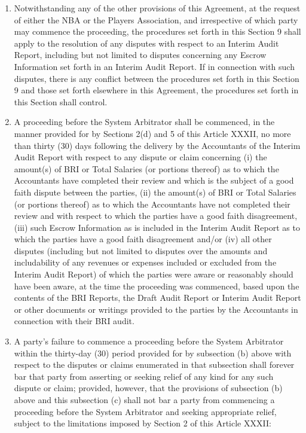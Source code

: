\documentclass[
]{book}
\providecommand{\tightlist}{%
  \setlength{\itemsep}{0pt}\setlength{\parskip}{0pt}}
\begin{document}
\begin{enumerate}
\def\labelenumi{(\alph{enumi})}
\tightlist
\item
  Notwithstanding any of the other provisions of this Agreement, at the request of either the NBA or the Players Association, and irrespective of which party may commence the proceeding, the procedures set forth in this Section 9 shall apply to the resolution of any disputes with respect to an Interim Audit Report, including but not limited to disputes concerning any Escrow Information set forth in an Interim Audit Report. If in connection with such disputes, there is any conflict between the procedures set forth in this Section 9 and those set forth elsewhere in this Agreement, the procedures set forth in this Section shall control.
\item
  A proceeding before the System Arbitrator shall be commenced, in the manner provided for by Sections 2(d) and 5 of this Article XXXII, no more than thirty (30) days following the delivery by the Accountants of the Interim Audit Report with respect to any dispute or claim concerning (i) the amount(s) of BRI or Total Salaries (or portions thereof) as to which the Accountants have completed their review and which is the subject of a good faith dispute between the parties, (ii) the amount(s) of BRI or Total Salaries (or portions thereof) as to which the Accountants have not completed their review and with respect to which the parties have a good faith disagreement, (iii) such Escrow Information as is included in the Interim Audit Report as to which the parties have a good faith disagreement and/or (iv) all other disputes (including but not limited to disputes over the amounts and includability of any revenues or expenses included or excluded from the Interim Audit Report) of which the parties were aware or reasonably should have been aware, at the time the proceeding was commenced, based upon the contents of the BRI Reports, the Draft Audit Report or Interim Audit Report or other documents or writings provided to the parties by the Accountants in connection with their BRI audit.
\item
  A party's failure to commence a proceeding before the System Arbitrator within the thirty-day (30) period provided for by subsection (b) above with respect to the disputes or claims enumerated in that subsection shall forever bar that party from asserting or seeking relief of any kind for any such dispute or claim; provided, however, that the provisions of subsection (b) above and this subsection (c) shall not bar a party from commencing a proceeding before the System Arbitrator and seeking appropriate relief, subject to the limitations imposed by Section 2 of this Article XXXII:


\end{enumerate}
\end{document}
